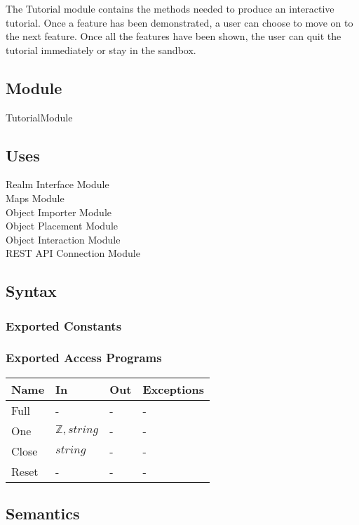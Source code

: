 \documentclass[12pt, titlepage]{article}
\begin{document}
The Tutorial module contains the methods needed to produce an interactive tutorial. Once a feature has been demonstrated, a user can choose to move on to the next feature. Once all the features have been shown, the user can quit the tutorial immediately or stay in the sandbox.

\subsection{Module}

TutorialModule

\subsection{Uses}

Realm Interface Module\\
Maps Module\\
Object Importer Module\\
Object Placement Module\\
Object Interaction Module\\
REST API Connection Module

\subsection{Syntax}

\subsubsection{Exported Constants}

\subsubsection{Exported Access Programs}

\begin{center}
\begin{tabular}{p{2cm} p{4cm} p{4cm} p{2cm}}
\hline
\textbf{Name} & \textbf{In} & \textbf{Out} & \textbf{Exceptions} \\
\hline
Full & - & - & - \\
One & $\mathbb{Z}, string$ & - & - \\
Close & $string$ & - & - \\
Reset & - & - & - \\
\hline
\end{tabular}
\end{center}

\subsection{Semantics}
\end{document}
